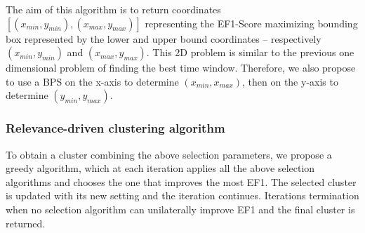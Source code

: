 The aim of this algorithm is to return coordinates $[(x_{min},y_{min}),(x_{max},y_{max})]$ representing the EF1-Score maximizing bounding box represented by the lower and upper bound coordinates -- respectively $(x_{min},y_{min})$ and $(x_{max},y_{max})$. This 2D problem is similar to the previous one dimensional problem of finding the best time window. Therefore, we also propose to use a BPS  on the x-axis to determine $(x_{min},x_{max})$, then on the y-axis to determine $(y_{min},y_{max})$. 


\subsubsection{Relevance-driven clustering algorithm} To obtain a cluster combining the above selection parameters, we propose a greedy algorithm, which at each iteration applies all the above selection algorithms and chooses the one that improves the most EF1.  The selected cluster is updated with its new setting and the iteration continues.  Iterations termination when no selection algorithm can unilaterally improve EF1 and the final cluster is returned.



